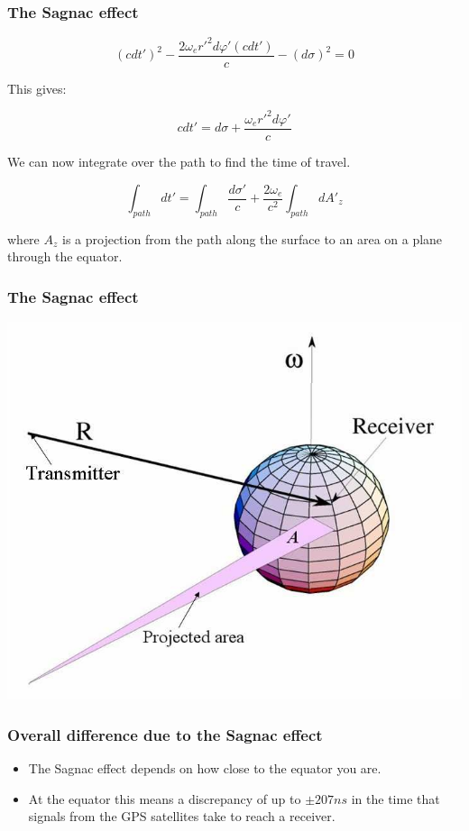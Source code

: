 \documentclass[xcolor=dvipsnames,usepdftitle=false]{beamer}
\renewcommand\phi{\varphi}
\begin{document}
\begin{frame}

\frametitle{The Sagnac effect}

\[(cdt')^2 - \frac{2\omega_{e} {r'}^2 d\phi' (cdt')}{c} - (d \sigma)^2 = 0 \]

This gives:

\[c dt' = d\sigma + \frac{\omega_{e} {r'}^2 d\phi'}{c}\]

\vspace{\baselineskip} \pause

We can now integrate over the path to find the time of travel. 

\[\int_{path} dt' = \int_{path} \frac{d \sigma'}{c} + \frac{2\omega_{e}}{c^2} \int_{path} d {A'}_{z} \]

where $A_z$ is a projection from the path along the surface to an area on a plane through the equator.
\end{frame}

\begin{frame}

\frametitle{The Sagnac effect}

\includegraphics[scale=0.4]{images/sagnac.png}

\end{frame}

\begin{frame}

\frametitle{Overall difference due to the Sagnac effect}

\begin{itemize}
	\item The Sagnac effect depends on how close to the equator you are. \vspace{\baselineskip}
	\item At the equator this means a discrepancy of up to $\pm 207 ns$ in the time that signals from the GPS satellites take to reach a receiver.
\end{itemize}

\end{frame}
\end{document}

